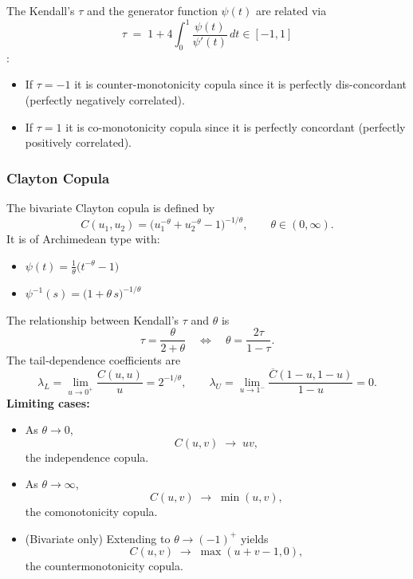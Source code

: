 \documentclass[11pt]{article}
\newcommand{\noi}{\noindent}
\begin{document}
\noi The Kendall’s $\tau$ and the generator function $\psi(t)$ are related via
\[
\tau \;=\;1+4\int_{0}^{1}\frac{\psi(t)}{\psi'(t)}\,dt \in [-1,1]
\]
\noi {}: 
\begin{itemize}
    \item If $\tau = -1$ it is counter-monotonicity copula since it is perfectly dis-concordant (perfectly negatively correlated).
    \item If $\tau = 1$ it is co-monotonicity copula since it is perfectly concordant (perfectly positively correlated).
\end{itemize}

\subsubsection{Clayton Copula}
\noi The bivariate Clayton copula is defined by
\[
C(u_1,u_2)
=\bigl(u_1^{-\theta}+u_2^{-\theta}-1\bigr)^{-1/\theta},
\qquad \theta\in(0,\infty).
\]
\noi It is of Archimedean type with:
\begin{itemize}
    \item $\displaystyle \psi(t)=\frac{1}{\theta}\bigl(t^{-\theta}-1\bigr)$
    \item $\displaystyle \psi^{-1}(s)=\bigl(1+\theta\,s\bigr)^{-1/\theta}$
\end{itemize}
\noi The relationship between Kendall’s $\tau$ and $\theta$ is
\[
\tau=\frac{\theta}{2+\theta}
\quad\Longleftrightarrow\quad
\theta=\frac{2\tau}{1-\tau}.
\]
\noi The tail‐dependence coefficients are
\[
\lambda_L
=\lim_{u\to0^+}\frac{C(u,u)}{u}
=2^{-1/\theta},
\qquad
\lambda_U
=\lim_{u\to1^-}\frac{\overline{C}(1-u,1-u)}{1-u}
=0.
\]
\noi \textbf{Limiting cases:}
\begin{itemize}
    \item As $\theta\to0$, 
    \[
        C(u,v)\;\to\;uv,
    \]
    the independence copula.
    \item As $\theta\to\infty$, 
    \[
        C(u,v)\;\to\;\min(u,v),
    \]
    the comonotonicity copula.
    \item (Bivariate only) Extending to $\theta\to(-1)^+$ yields 
    \[
        C(u,v)\;\to\;\max(u+v-1,0),
    \]
    the countermonotonicity copula.
\end{itemize}
\end{document}
